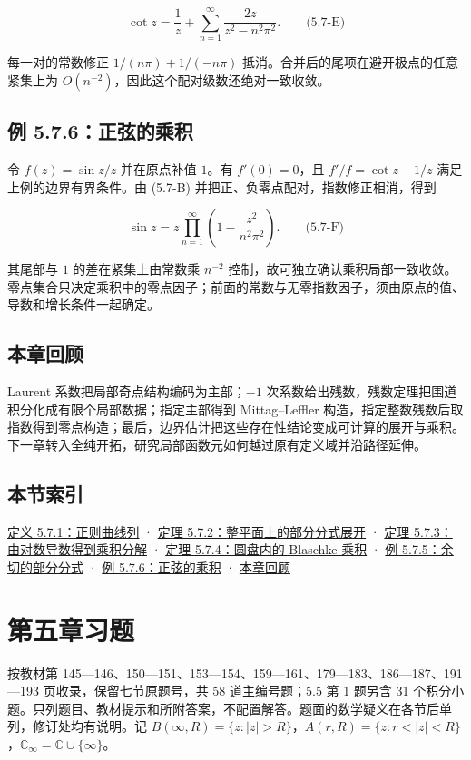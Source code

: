 \documentclass[11pt,a4paper]{article}
\begin{document}
\[
\cot z=\frac1z+\sum_{n=1}^\infty\frac{2z}{z^2-n^2\pi^2}.
\qquad\text{(5.7-E)}
\]

每一对的常数修正 \(1/(n\pi)+1/(-n\pi)\)
抵消。合并后的尾项在避开极点的任意紧集上为
\(O(n^{-2})\)，因此这个配对级数还绝对一致收敛。

\subsection{例 5.7.6：正弦的乘积}\label{ch05-s7-heading-6}

令 \(f(z)=\sin z/z\) 并在原点补值 \(1\)。有 \(f'(0)=0\)，且
\(f'/f=\cot z-1/z\) 满足上例的边界有界条件。由 (5.7-B)
并把正、负零点配对，指数修正相消，得到

\[
\sin z=z\prod_{n=1}^\infty\left(1-\frac{z^2}{n^2\pi^2}\right).
\qquad\text{(5.7-F)}
\]

其尾部与 \(1\) 的差在紧集上由常数乘 \(n^{-2}\)
控制，故可独立确认乘积局部一致收敛。零点集合只决定乘积中的零点因子；前面的常数与无零指数因子，须由原点的值、导数和增长条件一起确定。

\subsection{本章回顾}\label{ch05-s7-heading-7}

Laurent 系数把局部奇点结构编码为主部；\(-1\)
次系数给出残数，残数定理把围道积分化成有限个局部数据；指定主部得到
Mittag--Leffler
构造，指定整数残数后取指数得到零点构造；最后，边界估计把这些存在性结论变成可计算的展开与乘积。下一章转入全纯开拓，研究局部函数元如何越过原有定义域并沿路径延伸。

\subsection{本节索引}\label{ch05-s7-heading-8}

\hyperref[ch05-s7-heading-1]{定义 5.7.1：正则曲线列} · \hyperref[ch05-s7-heading-2]{定理
5.7.2：整平面上的部分分式展开} · \hyperref[ch05-s7-heading-3]{定理
5.7.3：由对数导数得到乘积分解} · \hyperref[ch05-s7-heading-4]{定理
5.7.4：圆盘内的 Blaschke 乘积} · \hyperref[ch05-s7-heading-5]{例
5.7.5：余切的部分分式} · \hyperref[ch05-s7-heading-6]{例 5.7.6：正弦的乘积} ·
\hyperref[ch05-s7-heading-7]{本章回顾}

\clearpage\section*{第五章习题}
按教材第
145---146、150---151、153---154、159---161、179---183、186---187、191---193
页收录，保留七节原题号，共 58 道主编号题；5.5 第 1 题另含 31
个积分小题。只列题目、教材提示和所附答案，不配置解答。题面的数学疑义在各节后单列，修订处均有说明。记
\(B(\infty,R)=\{z:|z|>R\}\)，\(A(r,R)=\{z:r<|z|<R\}\)，\(\mathbb C_\infty=\mathbb C\cup\{\infty\}\)。
\end{document}
